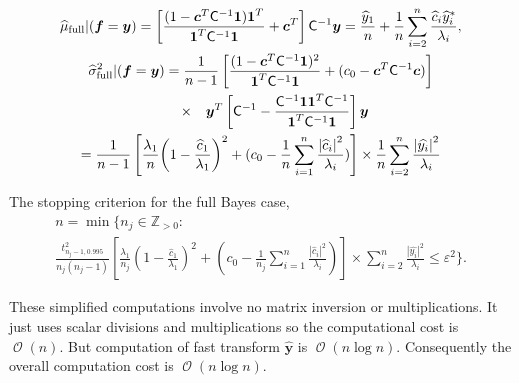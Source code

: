 \documentclass[twocolumn]{svjour3}          %
\DeclareMathOperator{\Order}{{\mathcal O}}
\newcommand{\bm}[1]{\boldsymbol{#1}}
\newcommand{\posIntegers}{\mathbb{Z}_{> 0}}
\newcommand{\vc}{\bm{c}}
\newcommand{\vf}{\bm{f}}
\newcommand{\vy}{\bm{y}}
\newcommand{\vone}{\bm{1}}
\newcommand{\mC}{\mathsf{C}}
\def\abs#1{\ensuremath{\left \lvert #1 \right \rvert}}
\begin{document}
\begin{gather}\label{FJH:eq:cubFull}
\widehat{\mu}_{\textup{full}}  \vert ( \vf = \vy) = \left[\frac{(1 -  \vc^T \mC^{-1}\vone)\vone^T}{\vone^T \mC^{-1} \vone} + \vc^T \right] \mC^{-1}  \vy = 
 \frac{\widehat{y}_1}{n} +
 \frac 1n \sum_{i=2}^n \frac{ \widehat{c}_i \widehat{y}_i^*}{\lambda_i},
\\
\label{FJH:eq:signmaFull}
\widehat{\sigma}^2_{\textup{full}}  \vert ( \vf = \vy)  
= \frac{1}{n-1}
\left[\frac{(1 - \vc^T \mC^{-1} \vone)^2}{\vone^T \mC^{-1} \vone} + (c_0  -\vc ^T \mC^{-1} \vc) \right] 
\\
\nonumber
\qquad \times \quad \vy^T\left[ \mC^{-1} 
- \frac{ \mC^{-1} \vone\vone^T \mC^{-1}}{\vone^T \mC^{-1} \vone}  \right]\vy 
\\ \nonumber
=
\frac{1}{n-1} \left[\frac{\lambda_1}{n}{\left(1 - \frac{\widehat{c}_1}{\lambda_1}\right)^2} + (c_0  - \frac 1n \sum_{i=1}^n \frac{\abs{\widehat{c}_i}^2}{\lambda_i}) \right] 
\times
\frac{1}{n} \sum_{i=2}^n \frac{\abs{\widehat{y_i}}^2}{\lambda_i}
\end{gather}

The stopping criterion for the full Bayes case,  
\begin{multline} \label{FJH:eq:stopcritHyper}
n  = \min \biggl \{n_j \in \posIntegers:  
\\
\frac {t_{n_j-1,0.995}^2}{n_j(n_j - 1)}  
\left[\frac{\lambda_1}{n_j}{\left(1 - \frac{\widehat{c}_1}{\lambda_1}\right)^2} + (c_0  - \frac{1}{n_j} \sum_{i=1}^n \frac{\abs{\widehat{c}_i}^2}{\lambda_i}) \right] 
 \times \sum_{i=2}^n \frac{\abs{\widehat{y_i}}^2}{\lambda_i}  \le \varepsilon^2 \biggr\}.
\end{multline}


These simplified computations involve no matrix inversion or multiplications. 
It just uses scalar divisions and multiplications so the computational cost is $\Order(n)$. 
But computation of fast transform $\widehat{\vy}$ is $\Order(n \log n)$.  Consequently the overall computation cost is $\Order(n \log n )$. 
\end{document}
